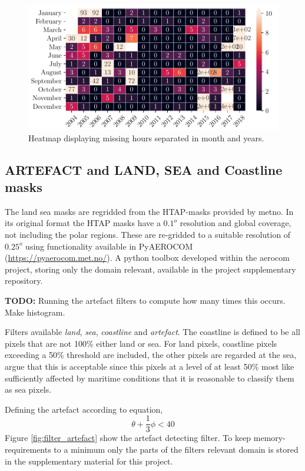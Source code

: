 \begin{figure}
    \centering
    \includegraphics[scale = 1.0]{python_figs/heatmap_missing_values.pdf}
    \caption[Heatmap showing missing hours for all months or years.]{Heatmap displaying missing hours separated in month and years.}
    \label{fig:heatmap_missing_values}
\end{figure}



\subsection{ARTEFACT and LAND, SEA and Coastline masks} \label{sec:artefact}
The land sea masks are regridded from the HTAP-masks provided by \acrfull{metno}.  In its original format the HTAP masks have a $0.1^o$ resolution and global coverage, not including the polar regions. These are re-gridded to a suitable resolution of $0.25^o$ using functionality available in PyAEROCOM (\href{https://pyaerocom.met.no/}{https://pyaerocom.met.no/}). A python toolbox developed within the \acrfull{aerocom} project, storing only the domain relevant, available in the project supplementary repository. 

\textbf{TODO:} Running the artefact filters to compute how many times this occurs. Make histogram.

Filters available \textit{land}, \textit{sea}, \textit{coastline} and \textit{artefact}. The coastline is defined to be all pixels that are not 100\% either land or sea. For land pixels, coastline pixels exceeding a 50\% threshold are included, the other pixels are regarded at the sea, argue that this is acceptable since this pixels at a level of at least 50\% most like sufficiently affected by maritime conditions that it is reasonable to classify them as sea pixels.

Defining the artefact according to equation, 
\begin{equation} \label{eq:artefact}
    \theta + \frac{1}{3}\phi < 40
\end{equation}
Figure \ref{fig:filter_artefact} show the artefact detecting filter. To keep memory-requirements to a minimum only the parts of the filters relevant domain is stored in the supplementary material for this project.

